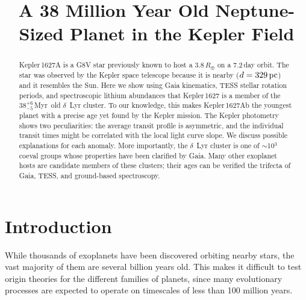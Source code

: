\documentclass[12pt,modern,twocolumn,tighten]{aastex63}
\newcommand{\clusterage}{$38^{+6}_{-5}$\,Myr} %
\begin{document}
\title{
  A 38 Million Year Old Neptune-Sized Planet in the Kepler Field
}



\begin{abstract}
  Kepler\,1627A is a G8V star previously known to host a
  $3.8\,R_\oplus$  on a 7.2\,day orbit.  The star was
  observed by the Kepler space telescope because it is nearby
  ($d=329\,{\rm pc}$) and it resembles the Sun.  Here we show using
  Gaia kinematics, TESS stellar rotation periods, and spectroscopic
  lithium abundances that Kepler\,1627 is a member of the \clusterage\
  old $\delta$~Lyr cluster.  To our knowledge, this makes
  Kepler\,1627Ab the youngest planet with a precise age yet found by
  the \replaced{main}{prime} Kepler mission.  The Kepler photometry shows two
  peculiarities: the average transit profile is asymmetric, and the
  individual transit times might be correlated with the local light curve
  slope.  We discuss possible explanations for each anomaly.  More
  importantly, the $\delta$~Lyr cluster
  is one of $\sim$10$^3$ coeval groups whose properties have been clarified
  by Gaia.  Many other exoplanet hosts are candidate members
  of these clusters; their ages can be verified  the
  trifecta of Gaia, TESS, and ground-based spectroscopy.
\end{abstract}




\section{Introduction}

While thousands of exoplanets have been discovered orbiting nearby
stars, the vast majority of them are several billion years old.  This
makes it difficult to test origin theories for the different families
of planets, since many evolutionary processes are expected to operate
on timescales of less than 100 million years.
\end{document}

